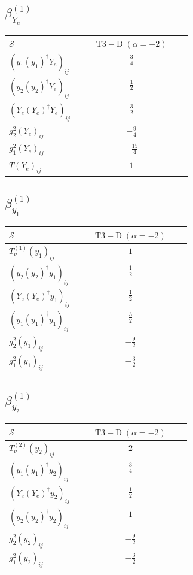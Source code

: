 \documentclass[9pt]{article}
\begin{document}
\subsection*{$ \beta_{Y_e}^{(1)} $}
\begin{longtable}{@{}p{0.38\linewidth}c@{}}
\toprule
$\mathcal{S}$ & $ \mathrm{T3-D}\;(\alpha=-2) $ \\
\midrule
$ (y_1 (y_1)^{\dagger} Y_e)_{ij} $ & $ \frac{3}{4} $ \\
$ (y_2 (y_2)^{\dagger} Y_e)_{ij} $ & $ \frac{1}{2} $ \\
$ (Y_e (Y_e)^{\dagger} Y_e)_{ij} $ & $ \frac{3}{2} $ \\
$ g_2^2 (Y_e)_{ij} $ & $ - \frac{9}{4} $ \\
$ g_1^2 (Y_e)_{ij} $ & $ - \frac{15}{4} $ \\
$ T (Y_e)_{ij} $ & $ 1 $ \\
\bottomrule
\end{longtable}
\subsection*{$ \beta_{y_1}^{(1)} $}
\begin{longtable}{@{}p{0.38\linewidth}c@{}}
\toprule
$\mathcal{S}$ & $ \mathrm{T3-D}\;(\alpha=-2) $ \\
\midrule
$ T_{\nu}^{(1)} (y_1)_{ij} $ & $ 1 $ \\
$ (y_2 (y_2)^{\dagger} y_1)_{ij} $ & $ \frac{1}{2} $ \\
$ (Y_e (Y_e)^{\dagger} y_1)_{ij} $ & $ \frac{1}{2} $ \\
$ (y_1 (y_1)^{\dagger} y_1)_{ij} $ & $ \frac{3}{2} $ \\
$ g_2^2 (y_1)_{ij} $ & $ - \frac{9}{2} $ \\
$ g_1^2 (y_1)_{ij} $ & $ - \frac{3}{2} $ \\
\bottomrule
\end{longtable}
\subsection*{$ \beta_{y_2}^{(1)} $}
\begin{longtable}{@{}p{0.38\linewidth}c@{}}
\toprule
$\mathcal{S}$ & $ \mathrm{T3-D}\;(\alpha=-2) $ \\
\midrule
$ T_{\nu}^{(2)} (y_2)_{ij} $ & $ 2 $ \\
$ (y_1 (y_1)^{\dagger} y_2)_{ij} $ & $ \frac{3}{4} $ \\
$ (Y_e (Y_e)^{\dagger} y_2)_{ij} $ & $ \frac{1}{2} $ \\
$ (y_2 (y_2)^{\dagger} y_2)_{ij} $ & $ 1 $ \\
$ g_2^2 (y_2)_{ij} $ & $ - \frac{9}{2} $ \\
$ g_1^2 (y_2)_{ij} $ & $ - \frac{3}{2} $ \\
\bottomrule
\end{longtable}
\end{document}

